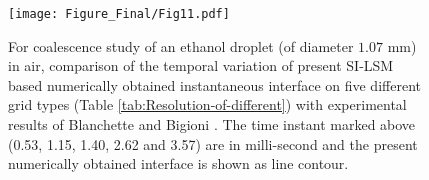 \documentclass[preprint,12pt]{elsarticle}
\begin{document}
\begin{figure}
\begin{centering}
\texttt{[image: Figure\_Final/Fig11.pdf]}
\par\end{centering}





\protect\caption{\label{fig:Comparison-of-present}For coalescence study of an ethanol droplet (of diameter $1.07$ mm) in air, comparison of the temporal variation of present SI-LSM based numerically obtained instantaneous interface on five different grid types (Table \ref{tab:Resolution-of-different}) with experimental results of Blanchette and Bigioni \cite{blanchette2006}. The time instant marked above (0.53, 1.15, 1.40, 2.62 and 3.57) are in milli-second and the present numerically obtained interface is shown as line contour.}


\end{figure}
\end{document}
